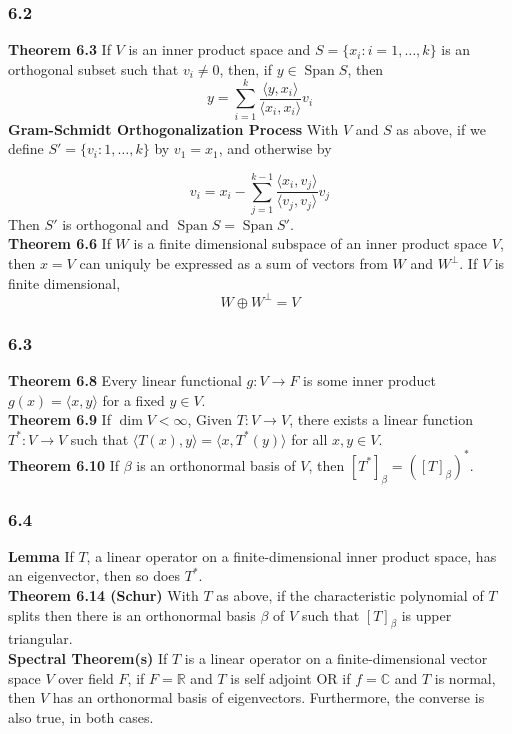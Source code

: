 \documentclass{article}
\DeclareMathOperator{\Span}{Span}
\begin{document}
\subsubsection*{6.2}
\textbf{Theorem 6.3} If $V$ is an inner product space and $S= \{ x_i: i = 1, \ldots, k\}$ is an orthogonal subset such that $v_i \neq 0$, then, if $y \in \Span S$, then $$y = \sum_{i=1}^k\frac{\langle y, x_i\rangle}{\langle x_i, x_i \rangle}v_i$$
\textbf{Gram-Schmidt Orthogonalization Process} With $V$ and $S$ as above, if we define $S' = \{ v_i: 1, \ldots, k\}$ by $v_1 = x_1$, and otherwise by 

$$v_i = x_i - \sum_{j = 1}^{k-1} \frac{\langle x_i, v_j \rangle}{\langle v_j, v_j\rangle} v_j$$
Then $S'$ is orthogonal and $\Span S = \Span S'$. \\ 
\textbf{Theorem 6.6} If $W$ is a finite dimensional subspace of an inner product space $V$, then $x = V$ can uniquly be expressed as a sum of vectors from $W$ and $W^\perp$. If $V$ is finite dimensional, $$ W \oplus W^\perp = V$$
\subsubsection*{6.3}
\textbf{Theorem 6.8} Every linear functional $g:V \to F$ is some inner product $g(x) = \langle x, y\rangle$ for a fixed $y \in V$. \\
\textbf{Theorem 6.9} If $\dim V < \infty$, Given $T: V \to V$, there exists a linear function $T^*: V \to V$ such that $\langle T(x) , y \rangle = \langle x, T^*(y) \rangle $ for all $x, y \in V$. \\
\textbf{Theorem 6.10} If $\beta$ is an orthonormal basis of $V$, then $[T^*]_\beta = ([T]_\beta)^*$. 


\subsubsection*{6.4}
\textbf{Lemma} If $T$, a linear operator on a finite-dimensional inner product space, has an eigenvector, then so does $T^*$. \\
\textbf{Theorem 6.14 (Schur)} With $T$ as above, if the characteristic polynomial of $T$ splits then there is an orthonormal basis $\beta$ of $V$ such that $[T]_\beta$ is upper triangular. \\
\textbf{Spectral Theorem(s)} If $T$ is a linear operator on a finite-dimensional vector space $V$ over field $F$, if $F= \mathbb{R}$ and $T$ is self adjoint OR if $f = \mathbb{C}$ and $T$ is normal, then $V$ has an orthonormal basis of eigenvectors. Furthermore, the converse is also true, in both cases. \\





\end{document}
